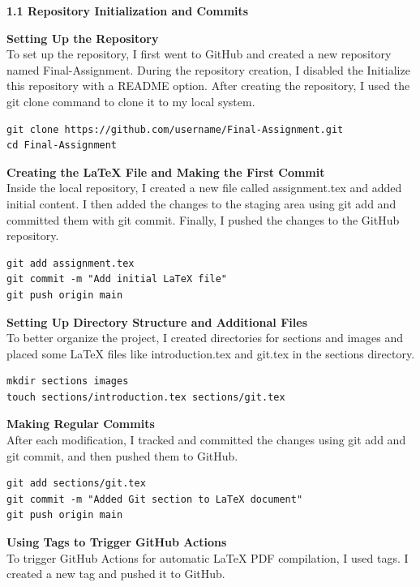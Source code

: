 \documentclass{article}
\begin{document}
\textbf{1.1 Repository Initialization and Commits}

\textbf{Setting Up the Repository} \\
To set up the repository, I first went to GitHub and created a new repository named Final-Assignment. During the repository creation, I disabled the Initialize this repository with a README option. After creating the repository, I used the git clone command to clone it to my local system.

\begin{verbatim}
git clone https://github.com/username/Final-Assignment.git
cd Final-Assignment
\end{verbatim}

\textbf{Creating the LaTeX File and Making the First Commit} \\
Inside the local repository, I created a new file called assignment.tex and added initial content. I then added the changes to the staging area using git add and committed them with git commit. Finally, I pushed the changes to the GitHub repository.

\begin{verbatim}
git add assignment.tex
git commit -m "Add initial LaTeX file"
git push origin main
\end{verbatim}

\textbf{Setting Up Directory Structure and Additional Files} \\
To better organize the project, I created directories for sections and images and placed some LaTeX files like introduction.tex and git.tex in the sections directory.

\begin{verbatim}
mkdir sections images
touch sections/introduction.tex sections/git.tex
\end{verbatim}

\textbf{Making Regular Commits} \\
After each modification, I tracked and committed the changes using git add and git commit, and then pushed them to GitHub.

\begin{verbatim}
git add sections/git.tex
git commit -m "Added Git section to LaTeX document"
git push origin main
\end{verbatim}

\textbf{Using Tags to Trigger GitHub Actions} \\
To trigger GitHub Actions for automatic LaTeX PDF compilation, I used tags. I created a new tag and pushed it to GitHub.
\end{document}
